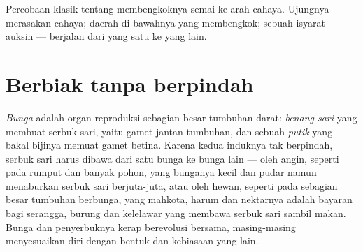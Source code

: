 \begin{omfigure}

{\small Percobaan klasik tentang membengkoknya semai ke arah cahaya.
Ujungnya merasakan cahaya; daerah di bawahnya yang membengkok; sebuah
isyarat --- auksin --- berjalan dari yang satu ke yang lain.}
\end{omfigure}

\section{Berbiak tanpa berpindah}

\begin{proposition}\label{prop:g12:plant-rooted-life:flowers}
\emph{Bunga} adalah organ reproduksi sebagian besar tumbuhan darat:
\emph{benang sari} yang membuat serbuk sari, yaitu gamet jantan
tumbuhan, dan sebuah \emph{putik} yang bakal bijinya memuat gamet
betina. Karena kedua induknya tak berpindah, serbuk sari harus dibawa
dari satu bunga ke bunga lain --- oleh angin, seperti pada rumput dan
banyak pohon, yang bunganya kecil dan pudar namun menaburkan serbuk
sari berjuta-juta, atau oleh hewan, seperti pada sebagian besar
tumbuhan berbunga, yang mahkota, harum dan nektarnya adalah bayaran
bagi serangga, burung dan kelelawar yang membawa serbuk sari sambil
makan. Bunga dan penyerbuknya kerap berevolusi bersama, masing-masing
menyesuaikan diri dengan bentuk dan kebiasaan yang lain.
\end{proposition}
\admitted

